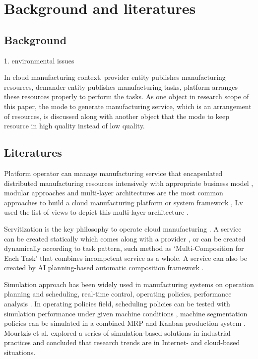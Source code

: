 \section{Background and literatures} %
\label{sec:literature_review}
\subsection{Background} %
\label{sub:background}
1. environmental issues

In cloud manufacturing context, provider entity publishes manufacturing resources, demander entity publishes manufacturing tasks, platform arranges these resources properly to perform the tasks. As one object in research scope of this paper, the mode to generate manufacturing service, which is an arrangement of resources, is discussed along with another object that the mode to keep resource in high quality instead of low quality.   


\subsection{Literatures} %
\label{sub:literatures}

Platform operator can manage manufacturing service that encapsulated distributed manufacturing resources intensively with appropriate business model \cite{Xu2012}, modular approaches and multi-layer architectures are the most common approaches to build a cloud manufacturing platform or system framework \cite{Tao2012,Valilai2013}, Lv used the list of views to depict this multi-layer architecture \cite{LvJuly312012-Aug.22012}.

Servitization is the key philosophy to operate cloud manufacturing \cite{li2010cloud}. A  service can be created statically which comes along with a provider \cite{Tao2012}, or can be created dynamically according to task pattern, such method as `Multi-Composition for Each Task' \cite{Liu2013} that combines incompetent service as a whole. A service can also be created by AI planning-based automatic composition framework \cite{OhJan.-March2008}.

Simulation approach has been widely used in manufacturing systems on operation planning and scheduling, real-time control, operating policies, performance analysis \cite{Smith2003}. In operating policies field, scheduling policies can be tested with simulation performance under given machine conditions \cite{Sabuncuoglu2003}, machine
segmentation policies can be simulated in a combined MRP and Kanban production system \cite{Felberbauer9-12Dec.2012}. Mourtzis et al. \cite{Mourtzis2015} explored a series of simulation-based solutions in industrial practices and concluded that research trends are in  Internet- and cloud-based situations.

